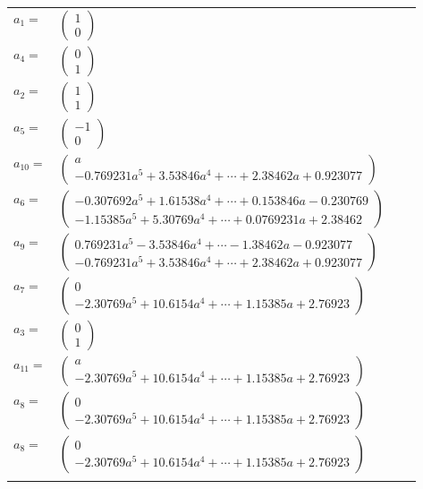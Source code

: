 \documentclass[1p]{elsarticle_modified}
\theoremstyle{definition}
\begin{document}
\begin{tabular}{m{7pt} m{180pt} m{7pt} m{180pt} }
\flushright $a_{1}=$&$\begin{pmatrix}1\\0\end{pmatrix}$ \\
\flushright $a_{4}=$&$\begin{pmatrix}0\\1\end{pmatrix}$ \\
\flushright $a_{2}=$&$\begin{pmatrix}1\\1\end{pmatrix}$ \\
\flushright $a_{5}=$&$\begin{pmatrix}-1\\0\end{pmatrix}$ \\
\flushright $a_{10}=$&$\begin{pmatrix}a\\-0.769231 a^{5}+3.53846 a^{4}+\cdots+2.38462 a+0.923077\end{pmatrix}$ \\
\flushright $a_{6}=$&$\begin{pmatrix}-0.307692 a^{5}+1.61538 a^{4}+\cdots+0.153846 a-0.230769\\-1.15385 a^{5}+5.30769 a^{4}+\cdots+0.0769231 a+2.38462\end{pmatrix}$ \\
\flushright $a_{9}=$&$\begin{pmatrix}0.769231 a^{5}-3.53846 a^{4}+\cdots-1.38462 a-0.923077\\-0.769231 a^{5}+3.53846 a^{4}+\cdots+2.38462 a+0.923077\end{pmatrix}$ \\
\flushright $a_{7}=$&$\begin{pmatrix}0\\-2.30769 a^{5}+10.6154 a^{4}+\cdots+1.15385 a+2.76923\end{pmatrix}$ \\
\flushright $a_{3}=$&$\begin{pmatrix}0\\1\end{pmatrix}$ \\
\flushright $a_{11}=$&$\begin{pmatrix}a\\-2.30769 a^{5}+10.6154 a^{4}+\cdots+1.15385 a+2.76923\end{pmatrix}$ \\
\flushright $a_{8}=$&$\begin{pmatrix}0\\-2.30769 a^{5}+10.6154 a^{4}+\cdots+1.15385 a+2.76923\end{pmatrix}$\\ \flushright $a_{8}=$&$\begin{pmatrix}0\\-2.30769 a^{5}+10.6154 a^{4}+\cdots+1.15385 a+2.76923\end{pmatrix}$\\&\end{tabular}
\end{document}
